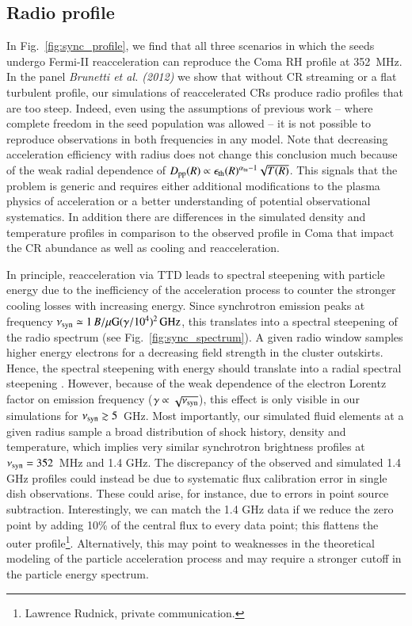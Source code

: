 \documentclass[fleqn,usenatbib,useAMS]{mnras}
\begin{document}
\subsection{Radio profile}
In Fig.~\ref{fig:sync_profile}, we find that all three scenarios in
which the seeds undergo Fermi-II reacceleration can reproduce the Coma
RH profile at 352~MHz. In the panel {\it Brunetti et al. (2012)} we
show that without CR streaming or a flat turbulent profile, our
simulations of reaccelerated CRs produce radio profiles that are too
steep. Indeed, even using the assumptions of previous work -- where
complete freedom in the seed population was allowed -- it is not
possible to reproduce observations in both frequencies in any
model. Note that decreasing acceleration efficiency with radius does
not change this conclusion much because of the weak radial dependence
of $D_{\mathrm{pp}}(R)\propto
\epsilon_{\mathrm{th}}(R)^{\alpha_{\mathrm{tu}}-1}\sqrt{T(R)}$. This
signals that the problem is generic and requires either additional
modifications to the plasma physics of acceleration or a better
understanding of potential observational systematics. In addition
there are differences in the simulated density and temperature
profiles in comparison to the observed profile in Coma that impact the
CR abundance as well as cooling and reacceleration.

In principle, reacceleration via TTD leads to spectral steepening with
particle energy due to the inefficiency of the acceleration process to
counter the stronger cooling losses with increasing energy. Since
synchrotron emission peaks at frequency $\nu_{\mathrm{syn}}\simeq 1\,
B/\mu{\mathrm{G}} (\gamma/10^4)^2\,{\mathrm{GHz}}$, this translates into a
spectral steepening of the radio spectrum (see
Fig.~\ref{fig:sync_spectrum}). A given radio window samples higher
energy electrons for a decreasing field strength in the cluster
outskirts. Hence, the spectral steepening with energy should translate
into a radial spectral steepening \citep{brunetti12}. However, because
of the weak dependence of the electron Lorentz factor on emission
frequency ($\gamma\propto\sqrt{\nu_{\mathrm{syn}}}$), this effect is only
visible in our simulations for $\nu_{\mathrm{syn}}\gtrsim5$~GHz. Most
importantly, our simulated fluid elements at a given radius sample a
broad distribution of shock history, density and temperature, which
implies very similar synchrotron brightness profiles at
$\nu_{\mathrm{syn}}=352$~MHz and 1.4 GHz. The discrepancy of the observed
and simulated 1.4 GHz profiles could instead be due to systematic flux
calibration error in single dish observations. These could arise, for
instance, due to errors in point source subtraction. Interestingly, we
can match the 1.4 GHz data if we reduce the zero point by adding 10\%
of the central flux to every data point; this flattens the outer
profile\footnote{Lawrence Rudnick, private communication.}.
Alternatively, this may point to weaknesses in the theoretical
modeling of the particle acceleration process and may require a
stronger cutoff in the particle energy spectrum.
\end{document}
